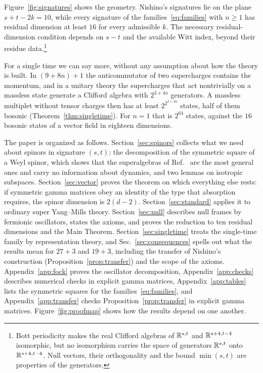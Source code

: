 Figure~\ref{fig:signatures} shows the geometry. Nishino's signatures lie on the plane $s+t-2k=10$, while every signature of the families~\eqref{eq:families} with $n\ge1$ has residual dimension at least $16$ for every admissible $k$. The necessary residual-dimension condition depends on $s-t$ and the available Witt index, beyond their residue data.\footnote{Bott periodicity makes the real Clifford algebras of $\mathbb{R}^{s,t}$ and $\mathbb{R}^{s+4,t-4}$ isomorphic, but no isomorphism carries the space of generators $\mathbb{R}^{s,t}$ onto $\mathbb{R}^{s+4,t-4}$. Null vectors, their orthogonality and the bound $\min(s,t)$ are properties of the generators.}

For a single time we can say more, without any assumption about how the theory is built. In $(9+8n)+1$ the anticommutator of two supercharges contains the momentum, and in a unitary theory the supercharges that act nontrivially on a massless state generate a Clifford algebra with $2^{3+4n}$ generators. A massless multiplet without tensor charges then has at least $2^{2^{2+4n}}$ states, half of them bosonic (Theorem~\ref{thm:singletime}). For $n=1$ that is $2^{64}$ states, against the $16$ bosonic states of a vector field in eighteen dimensions.

The paper is organized as follows. Section~\ref{sec:spinors} collects what we need about spinors in signature $(s,t)$: the decomposition of the symmetric square of a Weyl spinor, which shows that the superalgebras of Ref.~\cite{RiosMarraniChester2019} are the most general ones and carry no information about dynamics, and two lemmas on isotropic subspaces. Section~\ref{sec:vector} proves the theorem on which everything else rests: if symmetric gamma matrices obey an identity of the type that absorption requires, the spinor dimension is $2(d-2)$. Section~\ref{sec:standard} applies it to ordinary super Yang--Mills theory. Section~\ref{sec:null} describes null frames by fermionic oscillators, states the axioms, and proves the reduction to ten residual dimensions and the Main Theorem. Section~\ref{sec:singletime} treats the single-time family by representation theory, and Sec.~\ref{sec:consequences} spells out what the results mean for $27+3$ and $19+3$, including the transfer of Nishino's construction (Proposition~\ref{prop:transfer}) and the scope of the axioms. Appendix~\ref{app:fock} proves the oscillator decomposition, Appendix~\ref{app:checks} describes numerical checks in explicit gamma matrices, Appendix~\ref{app:tables} lists the symmetric squares for the families~\eqref{eq:families}, and Appendix~\ref{app:transfer} checks Proposition~\ref{prop:transfer} in explicit gamma matrices. Figure~\ref{fig:proofmap} shows how the results depend on one another.

